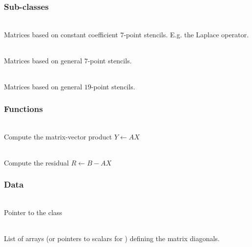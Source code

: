 \documentclass[11pt]{article}
\begin{document}
\subsubsection{ Sub-classes}

     \\
      Matrices based on constant coefficient $7$-point stencils.
      E.g. the Laplace operator.

     \\
      Matrices based on general $7$-point stencils.

     \\
      Matrices based on general $19$-point stencils.

  
\subsubsection{ Functions}

     \\ Compute the matrix-vector product $Y \leftarrow A X$

     \\ Compute the residual $R \leftarrow B - A X$

\subsubsection{ Data}

     \\
    Pointer to the  class

     \\
    List of arrays (or pointers to scalars for ) defining
    the matrix diagonals.
\end{document}
